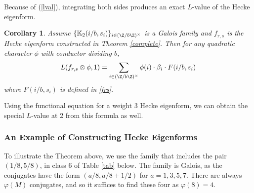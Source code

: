 \documentclass[12pt]{amsart}
\newtheorem{corollary}[theorem]{Corollary}
\theoremstyle{definition}
\theoremstyle{remark}
\begin{document}
Because of (\ref{lval}), integrating both sides produces an exact $L$-value of the Hecke eigenform.

\begin{corollary}\label{lval2}
    Assume $\{\mathbb{K}_2(i/b,s_i)\}_{i\in (\Z/b\Z)^\times}$ is a Galois family and $f_{r,s}$ is the Hecke eigenform constructed in Theorem \ref{complete}. Then for any quadratic character $\phi$ with conductor dividing $b$, $$L(f_{r,s}\otimes \phi,1)=\sum_{i\in (\Z/b\Z)^\times}\phi(i)\cdot \beta_i\cdot  F(i/b,s_i)$$ where $ F(i/b,s_i)$ is defined in \eqref{frs}. 
\end{corollary}
Using the functional equation for a weight 3 Hecke eigenform, we can obtain the special $L$-value at 2 from this formula as well.


\smallskip












\subsubsection{An Example of Constructing Hecke Eigenforms} 

To illustrate the Theorem above, we use the  family that includes the pair $(1/8,5/8)$, in class 6 of Table \ref{tab} below. The family is Galois, as the conjugates have the form $(a/8,a/8+1/2)$ for $a=1,3,5,7$. There are always $\varphi(M)$ conjugates, and so it suffices to find these four as $\varphi(8)=4$.
\end{document}
